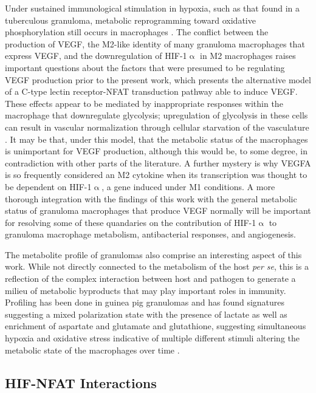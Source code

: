 Under sustained immunological stimulation in hypoxia, such as that found in a tuberculous granuloma, metabolic reprogramming toward oxidative phosphorylation still occurs in macrophages \citep{Wilson2019, Mehrotra2014}. The conflict between the production of VEGF, the M2\hyp{}like identity of many granuloma macrophages that express VEGF, and the downregulation of HIF\hyp{}1$\upalpha$ in M2 macrophages raises important questions about the factors that were presumed to be regulating VEGF production prior to the present work, which presents the alternative model of a C\hyp{}type lectin receptor\hyp{}NFAT transduction pathway able to induce VEGF. These effects appear to be mediated by inappropriate responses within the macrophage that downregulate glycolysis; upregulation of glycolysis in these cells can result in vascular normalization through cellular starvation of the vasculature \citep{Wenes2016}. It may be that, under this model, that the metabolic status of the macrophages is unimportant for VEGF production, although this would be, to some degree, in contradiction with other parts of the literature. A further mystery is why VEGFA is so frequently considered an M2 cytokine when its transcription was thought to be dependent on HIF\hyp{}1$\upalpha$, a gene induced under M1 conditions. A more thorough integration with the findings of this work with the general metabolic status of granuloma macrophages that produce VEGF normally will be important for resolving some of these quandaries on the contribution of HIF\hyp{}1$\upalpha$ to granuloma macrophage metabolism, antibacterial responses, and angiogenesis.

The metabolite profile of granulomas also comprise an interesting aspect of this work. While not directly connected to the metabolism of the host \textit{per se}, this is a reflection of the complex interaction between host and pathogen to generate a milieu of metabolic byproducts that may play important roles in immunity. Profiling has been done in guinea pig granulomas and has found signatures suggesting a mixed polarization state with the presence of lactate as well as enrichment of aspartate and glutamate and glutathione, suggesting simultaneous hypoxia and oxidative stress indicative of multiple different stimuli altering the metabolic state of the macrophages over time \citep{Somashekar2011}.

\subsection{HIF\hyp{}NFAT Interactions}\label{hifnfat}

